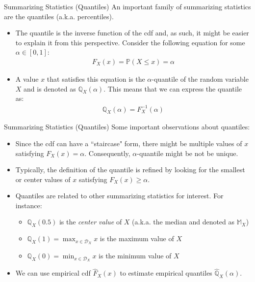 \documentclass[9pt]{beamer}
\begin{document}
%
\begin{frame}{Summarizing Statistics (Quantiles)}
An important family of summarizing statistics are the quantiles (a.k.a. percentiles). 
\begin{block}{}
\begin{itemize}
 \setlength{\itemsep}{10pt}
\item The quantile is the inverse function of the cdf and, as such, it might be easier to explain it from this perspective.  Consider the following equation for some $\alpha \in [0,1]$:
\begin{align*}
F_X(x)=\mathbb{P}(X\leq x)=\alpha 
\end{align*}
\item A value $x$ that satisfies this equation is the $\alpha$-quantile of the random variable $X$ and is denoted as $\mathbb{Q}_X(\alpha)$. This means that we can express the quantile as:
\begin{align*}
\mathbb{Q}_X(\alpha)=F^{-1}_X(\alpha) 
\end{align*}
\end{itemize}
\end{block}
\end{frame}

%
\begin{frame}{Summarizing Statistics (Quantiles)}
Some important observations about quantiles:
\begin{block}{}
\begin{itemize}
 \setlength{\itemsep}{10pt}
\item Since the cdf can have a ``staircase" form, there might be multiple values of $x$ satisfying $F_X(x)=\alpha$. Consequently, $\alpha$-quantile might be not be unique. 

\item Typically,  the definition of the quantile is refined by looking for the smallest or center values of $x$ satisfying $F_X(x)\geq \alpha$. 

\item Quantiles are related to other summarizing statistics for interest. For instance: 
\begin{itemize}
 \setlength{\itemsep}{5pt}
\item $\mathbb{Q}_{X}(0.5)$ is the {\em center value} of $X$ (a.k.a. the median and denoted as $\mathbb{M}_X$)
\item $\mathbb{Q}_X(1)=\displaystyle\max_{x\in \mathcal{D}_X }x$ is the maximum value of $X$
\item $\mathbb{Q}_{X}(0)=\displaystyle \min_{x\in \mathcal{D}_X }x$ is the minimum value of $X$ 
\end{itemize}
\item We can use empirical cdf $\hat{F}_X(x)$ to estimate empirical quantiles $\hat{\mathbb{Q}}_X(\alpha)$.
\end{itemize}
\end{block}
\end{frame}
\end{document}
